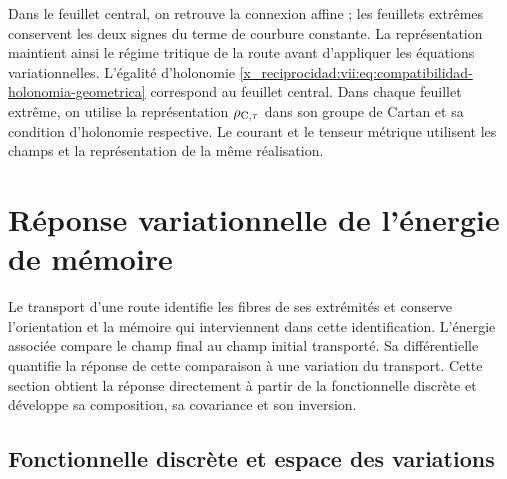 Dans le feuillet central, on retrouve la connexion affine ; les feuillets extrêmes
conservent les deux signes du terme de courbure constante. La
représentation maintient ainsi le régime tritique de la route avant
d'appliquer les équations variationnelles. L'égalité d'holonomie
\eqref{x_reciprocidad:vii:eq:compatibilidad-holonomia-geometrica} correspond au
feuillet central. Dans chaque feuillet extrême, on utilise la représentation
\(\rho_{{\rm C},\tau}\) dans son groupe de Cartan et sa condition
d'holonomie respective. Le courant et le tenseur métrique utilisent
les champs et la représentation de la même réalisation.




\chapter{Réponse variationnelle de l'énergie de mémoire}
\label{x_reciprocidad:vii:sec:variacion-memoria}

Le transport d'une route identifie les fibres de ses extrémités et conserve l'orientation et la mémoire qui interviennent dans cette identification. L'énergie associée compare le champ final au champ initial transporté. Sa différentielle quantifie la réponse de cette comparaison à une variation du transport. Cette section obtient la réponse directement à partir de la fonctionnelle discrète et développe sa composition, sa covariance et son inversion.

\section{Fonctionnelle discrète et espace des variations}
\label{x_reciprocidad:vii:subsec:funcional-memoria}

